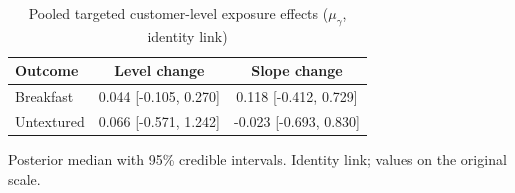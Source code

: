\begin{table}[H]
\centering
\caption{Pooled targeted customer-level exposure effects ($\mu_\gamma$, identity link)}
\label{tab:a6_mu_gamma}
\begin{tabular}{lcc}
\toprule
Outcome & Level change & Slope change \\
\midrule
Breakfast & 0.044 [-0.105, 0.270] & 0.118 [-0.412, 0.729] \\
Untextured & 0.066 [-0.571, 1.242] & -0.023 [-0.693, 0.830] \\
\bottomrule
\end{tabular}
\par\smallskip\footnotesize Posterior median with 95\% credible intervals. Identity link; values on the original scale.
\end{table}

